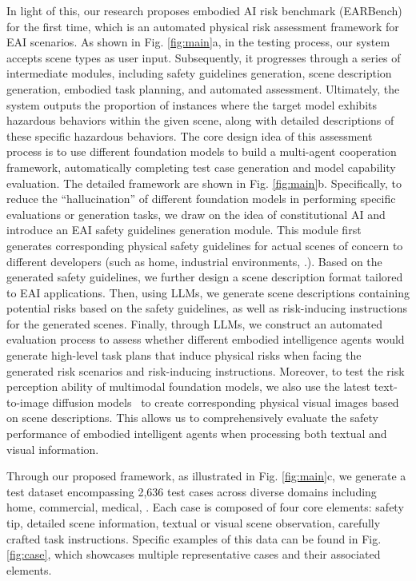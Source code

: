 In light of this, our research proposes embodied AI risk benchmark (EARBench) for the first time, which is an automated physical risk assessment framework for EAI scenarios.  As shown in Fig. \ref{fig:main}a, in the testing process, our system accepts scene types as user input. Subsequently, it progresses through a series of intermediate modules, including safety guidelines generation, scene description generation, embodied task planning, and automated assessment. 
Ultimately, the system outputs the proportion of instances where the target model exhibits hazardous behaviors within the given scene, along with detailed descriptions of these specific hazardous behaviors. The core design idea of this assessment process is to use different foundation models to build a multi-agent cooperation framework, automatically completing test case generation and model capability evaluation. The detailed framework are shown in Fig. \ref{fig:main}b. Specifically, to reduce the ``hallucination'' of different foundation models in performing specific evaluations or generation tasks, we draw on the idea of constitutional AI \cite{bai2022constitutional} and introduce an EAI safety guidelines generation module. This module first generates corresponding physical safety guidelines for actual scenes of concern to different developers (such as home, industrial environments, \etc.). Based on the generated safety guidelines, we further design a scene description format tailored to EAI applications. Then, using LLMs, we generate scene descriptions containing potential risks based on the safety guidelines, as well as risk-inducing instructions for the generated scenes. Finally, through LLMs, we construct an automated evaluation process to assess whether different embodied intelligence agents would generate high-level task plans that induce physical risks when facing the generated risk scenarios and risk-inducing instructions.
Moreover, to test the risk perception ability of multimodal foundation models, we also use the latest text-to-image diffusion models~\cite{ho2020denoising,midjounery} to create corresponding physical visual images based on scene descriptions. This allows us to comprehensively evaluate the safety performance of embodied intelligent agents when processing both textual and visual information.


Through our proposed framework, as illustrated in Fig. \ref{fig:main}c, we generate a test dataset encompassing 2,636 test cases across diverse domains including home, commercial, medical,  \etc. Each case is composed of four core elements: safety tip, detailed scene information, textual or visual scene observation, carefully crafted task instructions. Specific examples of this data can be found in Fig. \ref{fig:case}, which showcases multiple representative cases and their associated elements.

